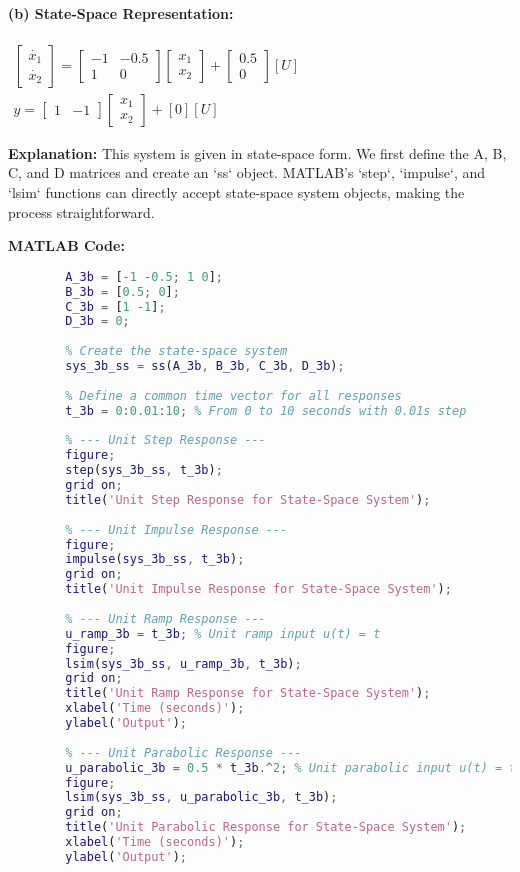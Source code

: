 \documentclass[a4paper,12pt]{article}
\begin{document}
	\paragraph{(b) State-Space Representation:}
	$\begin{array}{l} \begin{bmatrix} \dot{x_1} \\ \dot{x_2} \end{bmatrix} = \begin{bmatrix} -1 & -0.5 \\ 1 & 0 \end{bmatrix} \begin{bmatrix} x_1 \\ x_2 \end{bmatrix} + \begin{bmatrix} 0.5 \\ 0 \end{bmatrix} [U] \\ y = \begin{bmatrix} 1 & -1 \end{bmatrix} \begin{bmatrix} x_1 \\ x_2 \end{bmatrix} + [0] [U] \end{array}$
	
	\textbf{Explanation:}
	This system is given in state-space form. We first define the A, B, C, and D matrices and create an `ss` object. MATLAB's `step`, `impulse`, and `lsim` functions can directly accept state-space system objects, making the process straightforward.
	
	\textbf{MATLAB Code:}
	\begin{lstlisting}[language=Matlab, caption=MATLAB Code for Problem 3(b)]
		% Define state-space matrices
		A_3b = [-1 -0.5; 1 0];
		B_3b = [0.5; 0];
		C_3b = [1 -1];
		D_3b = 0;
		
		% Create the state-space system
		sys_3b_ss = ss(A_3b, B_3b, C_3b, D_3b);
		
		% Define a common time vector for all responses
		t_3b = 0:0.01:10; % From 0 to 10 seconds with 0.01s step
		
		% --- Unit Step Response ---
		figure;
		step(sys_3b_ss, t_3b);
		grid on;
		title('Unit Step Response for State-Space System');
		
		% --- Unit Impulse Response ---
		figure;
		impulse(sys_3b_ss, t_3b);
		grid on;
		title('Unit Impulse Response for State-Space System');
		
		% --- Unit Ramp Response ---
		u_ramp_3b = t_3b; % Unit ramp input u(t) = t
		figure;
		lsim(sys_3b_ss, u_ramp_3b, t_3b);
		grid on;
		title('Unit Ramp Response for State-Space System');
		xlabel('Time (seconds)');
		ylabel('Output');
		
		% --- Unit Parabolic Response ---
		u_parabolic_3b = 0.5 * t_3b.^2; % Unit parabolic input u(t) = t^2/2
		figure;
		lsim(sys_3b_ss, u_parabolic_3b, t_3b);
		grid on;
		title('Unit Parabolic Response for State-Space System');
		xlabel('Time (seconds)');
		ylabel('Output');
	\end{lstlisting}
	
\end{document}
